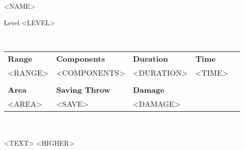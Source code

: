 \begin{framed}

\begin{minipage}{0.5\textwidth}
    \huge
    <NAME>
\end{minipage}
\begin{minipage}{0.45\textwidth}
    \flushright
    Level <LEVEL>
\end{minipage}\\
\medskip
\phantom{0}

\begin{tabularx}{1.0\textwidth}{XXXXX}
    \textbf{Range} & \textbf{Components} & \textbf{Duration} & \textbf{Time}\\
    <RANGE> & <COMPONENTS> & <DURATION> & <TIME>\\
    & & & \\
    \textbf{Area} & \textbf{Saving Throw} & \textbf{Damage} & \\
    <AREA> & <SAVE> & <DAMAGE>
\end{tabularx}\\
\phantom{0}\\
<TEXT>
<HIGHER>
\smallskip
\end{framed}